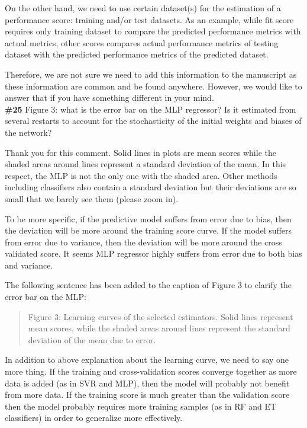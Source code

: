 \documentclass{ar2rc}
\begin{document}
    On the other hand, we need to use certain dataset(s) for the estimation of a performance score: training and/or test datasets. As an example, while fit score requires only training dataset to compare the predicted performance metrics with actual metrics, other scores compares actual performance metrics of testing dataset with the predicted performance metrics of the predicted dataset.

    Therefore, we are not sure we need to add this information to the manuscript as these information are common and be found anywhere. However, we would like to answer that if you have something different in your mind.\\


    \Comment \textbf{\#25} Figure 3: what is the error bar on the MLP regressor? Is it
    estimated from several restarts to account for the stochasticity of the
    initial weights and biases of the network?

    \Response Thank you for this comment. Solid lines in plots are mean scores while the shaded areas around lines represent a standard deviation of the mean. In this respect, the MLP is not the only one with the shaded area. Other methods including classifiers also contain a standard deviation but their deviations are so small that we barely see them (please zoom in).

    To be more specific, if the predictive model suffers from error due to bias, then the deviation will be more around the training score curve. If the model suffers from error due to variance, then the deviation will be more around the cross validated score. It seems MLP regressor highly suffers from error due to both bias and variance.

    The following sentence has been added to the caption of Figure 3 to clarify the error bar on the MLP:\\

    \begin{quote}
        Figure 3: Learning curves of the selected estimators. Solid lines represent mean scores, while the shaded areas around lines represent the standard deviation of the mean due to error.
    \end{quote}

    In addition to above explanation about the learning curve, we need to say one more thing. If the training and cross-validation scores converge together as more data is added (as in SVR and MLP), then the model will probably not benefit from more data. If the training score is much greater than the validation score then the model probably requires more training samples (as in RF and ET classifiers) in order to generalize more effectively.
\end{document}
